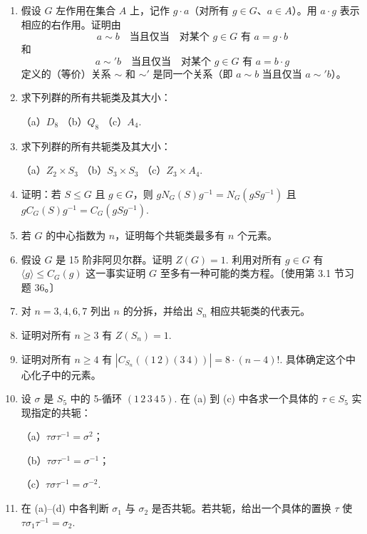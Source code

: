 \begin{enumerate}
\item 假设 \(G\) 左作用在集合 \(A\) 上，记作 \(g \cdot a\)（对所有 \(g \in G\)、\(a \in A\)）。用 \(a \cdot g\) 表示相应的右作用。证明由
\[
a \sim b \quad \text{当且仅当} \quad \text{对某个 } g \in G \text{ 有 } a = g \cdot b
\]
和
\[
a \sim' b \quad \text{当且仅当} \quad \text{对某个 } g \in G \text{ 有 } a = b \cdot g
\]
定义的（等价）关系 \(\sim\) 和 \(\sim'\) 是同一个关系（即 \(a \sim b\) 当且仅当 \(a \sim' b\)）。

\item 求下列群的所有共轭类及其大小：

（a）\(D_8\) \qquad（b）\(Q_8\) \qquad（c）\(A_4\).

\item 求下列群的所有共轭类及其大小：

（a）\(Z_2 \times S_3\) \qquad（b）\(S_3 \times S_3\) \qquad（c）\(Z_3 \times A_4\).

\item 证明：若 \(S \leq G\) 且 \(g \in G\)，则 \(gN_G(S)g^{-1} = N_G(gSg^{-1})\) 且 \(gC_G(S)g^{-1} = C_G(gSg^{-1})\).

\item 若 \(G\) 的中心指数为 \(n\)，证明每个共轭类最多有 \(n\) 个元素。

\item 假设 \(G\) 是 15 阶非阿贝尔群。证明 \(Z(G) = 1\). 利用对所有 \(g \in G\) 有 \(\langle g \rangle \leq C_G(g)\) 这一事实证明 \(G\) 至多有一种可能的类方程。〔使用第 3.1 节习题 36。〕

\item 对 \(n = 3, 4, 6, 7\) 列出 \(n\) 的分拆，并给出 \(S_n\) 相应共轭类的代表元。

\item 证明对所有 \(n \geq 3\) 有 \(Z(S_n) = 1\).

\item 证明对所有 \(n \geq 4\) 有 \(|C_{S_n}((1\,2)(3\,4))| = 8 \cdot (n-4)!\). 具体确定这个中心化子中的元素。

\item 设 \(\sigma\) 是 \(S_5\) 中的 5-循环 \((1\,2\,3\,4\,5)\). 在 (a) 到 (c) 中各求一个具体的 \(\tau \in S_5\) 实现指定的共轭：

（a）\(\tau\sigma\tau^{-1} = \sigma^2\)；

（b）\(\tau\sigma\tau^{-1} = \sigma^{-1}\)；

（c）\(\tau\sigma\tau^{-1} = \sigma^{-2}\).

\item 在 (a)–(d) 中各判断 \(\sigma_1\) 与 \(\sigma_2\) 是否共轭。若共轭，给出一个具体的置换 \(\tau\) 使 \(\tau\sigma_1\tau^{-1} = \sigma_2\).


\end{enumerate}
